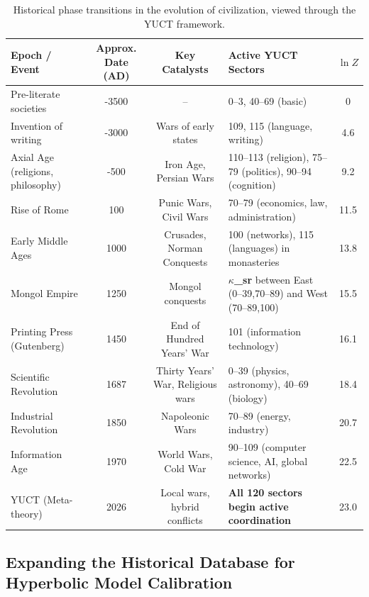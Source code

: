 \documentclass[12pt,a4paper]{article}
\theoremstyle{remark}
\begin{document}
	\begin{table}[htbp]
		\centering
		\caption{Historical phase transitions in the evolution of civilization, viewed through the YUCT framework.}
		\label{tab:historical-transitions}
		\scriptsize  
		\begin{tabular}{p{2.2cm} c c p{5.5cm} c}
			\toprule
			\textbf{Epoch / Event} & \textbf{Approx. Date (AD)} & \textbf{Key Catalysts} & \textbf{Active YUCT Sectors} & $\ln Z$ \\
			\midrule
			Pre-literate societies & -3500 & – & 0–3, 40–69 (basic) & 0 \\
			Invention of writing & -3000 & Wars of early states & 109, 115 (language, writing) & 4.6 \\
			Axial Age (religions, philosophy) & -500 & Iron Age, Persian Wars & 110–113 (religion), 75–79 (politics), 90–94 (cognition) & 9.2 \\
			Rise of Rome & 100 & Punic Wars, Civil Wars & 70–79 (economics, law, administration) & 11.5 \\
			Early Middle Ages & 1000 & Crusades, Norman Conquests & 100 (networks), 115 (languages) in monasteries & 13.8 \\
			Mongol Empire & 1250 & Mongol conquests & \textbf{$\kappa$\_sr} between East (0–39,70–89) and West (70–89,100) & 15.5 \\
			Printing Press (Gutenberg) & 1450 & End of Hundred Years' War & 101 (information technology) & 16.1 \\
			Scientific Revolution & 1687 & Thirty Years' War, Religious wars & 0–39 (physics, astronomy), 40–69 (biology) & 18.4 \\
			Industrial Revolution & 1850 & Napoleonic Wars & 70–89 (energy, industry) & 20.7 \\
			Information Age & 1970 & World Wars, Cold War & 90–109 (computer science, AI, global networks) & 22.5 \\
			YUCT (Meta-theory) & 2026 & Local wars, hybrid conflicts & \textbf{All 120 sectors begin active coordination} & 23.0 \\
			\bottomrule
		\end{tabular}
	\end{table}
	
	\subsection{Expanding the Historical Database for Hyperbolic Model Calibration}
	\label{subsec:historical-data}
	
\end{document}
